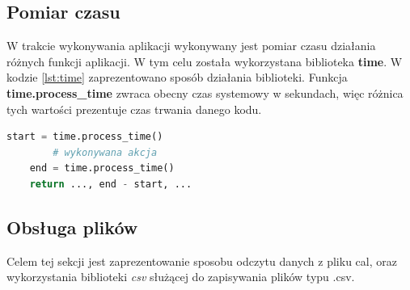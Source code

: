 \subsection{Pomiar czasu}
\label{ssec:timemethod}
W trakcie wykonywania aplikacji wykonywany jest pomiar czasu działania różnych funkcji aplikacji. W tym celu została wykorzystana biblioteka \textbf{time}. W kodzie \ref{lst:time} zaprezentowano sposób działania biblioteki. Funkcja \textbf{time.process\_time} zwraca obecny czas systemowy w sekundach, więc różnica tych wartości prezentuje czas trwania danego kodu.
\begin{lstlisting}[language=Python, caption=Pomiar czasu, label={lst:time}]
    start = time.process_time()
        # wykonywana akcja
    end = time.process_time()
    return ..., end - start, ...
\end{lstlisting}
\subsection{Obsługa plików}
Celem tej sekcji jest zaprezentowanie sposobu odczytu danych z pliku cal, oraz wykorzystania biblioteki \emph{csv} służącej do zapisywania plików typu .csv.
\label{ssec:filehandling}
